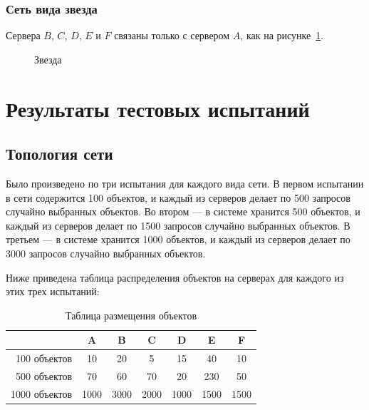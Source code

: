 			\subsubsection{Сеть вида звезда} 
				Сервера $B$, $C$, $D$, $E$ и $F$ связаны только с сервером $A$, как на рисунке~\ref{fig:star}.
				\begin{figure}[H] 
					\centering 
					\caption{Звезда} 
					\label{fig:star}
				\end{figure} 
		
	\section{Результаты тестовых испытаний}		
		\subsection{Топология сети}
			Было произведено по три испытания для каждого вида сети. В первом испытании в сети содержится 100 объектов, и каждый из серверов делает по 500 запросов случайно выбранных объектов.
			Во втором --- в системе хранится 500 объектов, и каждый из серверов делает по 1500 запросов случайно выбранных объектов. В третьем --- в системе хранится 1000 объектов, и каждый из серверов 
			делает по 3000 запросов случайно выбранных объектов. 
			
			Ниже приведена таблица распределения объектов на серверах для каждого из этих трех испытаний:
		
			\begin{table}[H]
				\small
				\centering
				\caption{Таблица размещения объектов}
				\begin{tabular} {|r|c|c|c|c|c|c|}
					\hline
						& A	    & B      & C      & D      & E     & F      \\
					\hline
	100 объектов		& 10    & 20     & 5      & 15     & 40    & 10     \\
	500 объектов		& 70	& 60	 & 70     & 20     & 230   & 50     \\
	1000 объектов		& 1000  & 3000   & 2000   & 1000   & 1500  & 1500   \\
					\hline
				\end{tabular}
			\end{table}
		
